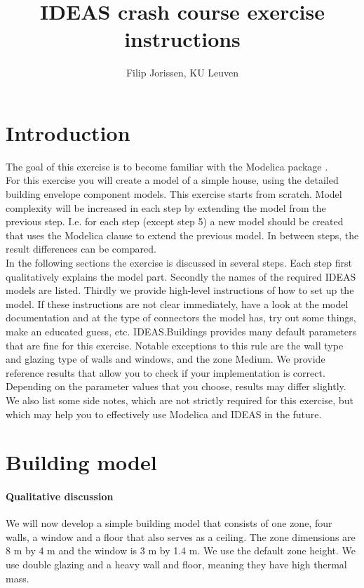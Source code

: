 \documentclass[10pt,a4paper]{article}
\begin{document}
\title{IDEAS crash course exercise instructions}
\author{Filip Jorissen, KU Leuven}
\maketitle

\section*{Introduction}
The goal of this exercise is to become familiar with the 
Modelica package . \\

For this exercise you will create a model of a simple house,
using the detailed building envelope component models.
This exercise starts from scratch. 
Model complexity will be increased in each step by 
extending the model from the previous step. 
I.e. for each step (except step 5) a new model should be created that uses
the Modelica  clause to extend the previous model.
In between steps, the result differences can be compared.\\


In the following sections the exercise is discussed 
in several steps. 
Each step first qualitatively explains the model part.
Secondly the names of the required IDEAS models 
are listed.
Thirdly we provide high-level instructions of how to
set up the model.
If these instructions are not clear immediately, 
have a look at the model documentation and at the type of
connectors the model has, 
try out some things, 
make an educated guess, etc.
IDEAS.Buildings provides many default parameters that are fine for
this exercise. Notable exceptions to this rule are
the wall type and glazing type of walls and windows, and the zone Medium.
We provide reference results that allow you to check
if your implementation is correct. 
Depending on the parameter values that you choose, results
may differ slightly.
We also list some side notes, which are not strictly required for this
exercise, but which may help you to effectively use Modelica
and IDEAS in the future.

\section{Building  model}
\paragraph{Qualitative discussion}
We will now develop a simple building model that consists of one zone,
four walls, a window and a floor that also serves as a ceiling.
The zone dimensions are 8 m by 4 m and the window is 3 m by 1.4 m. We use the default zone height.
We use double glazing and a heavy wall and floor, meaning they
have high thermal mass.
\end{document}
